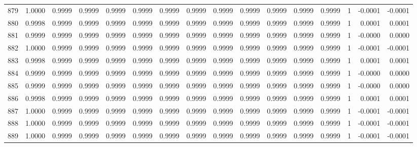 \begin{tabular}{lrrrrrrrrrrrrrrr}
879 &      1.0000 &  0.9999 &  0.9999 &  0.9999 &  0.9999 &  0.9999 &  0.9999 &  0.9999 &  0.9999 &  0.9999 &   0.9999 &     0.9999 &      1 &                   -0.0001 &                    -0.0001 \\
880 &      0.9998 &  0.9999 &  0.9999 &  0.9999 &  0.9999 &  0.9999 &  0.9999 &  0.9999 &  0.9999 &  0.9999 &   0.9999 &     0.9999 &      1 &                    0.0001 &                     0.0001 \\
881 &      0.9999 &  0.9999 &  0.9999 &  0.9999 &  0.9999 &  0.9999 &  0.9999 &  0.9999 &  0.9999 &  0.9999 &   0.9999 &     0.9999 &      1 &                   -0.0000 &                     0.0000 \\
882 &      1.0000 &  0.9999 &  0.9999 &  0.9999 &  0.9999 &  0.9999 &  0.9999 &  0.9999 &  0.9999 &  0.9999 &   0.9999 &     0.9999 &      1 &                   -0.0001 &                    -0.0001 \\
883 &      0.9998 &  0.9999 &  0.9999 &  0.9999 &  0.9999 &  0.9999 &  0.9999 &  0.9999 &  0.9999 &  0.9999 &   0.9999 &     0.9999 &      1 &                    0.0001 &                     0.0001 \\
884 &      0.9999 &  0.9999 &  0.9999 &  0.9999 &  0.9999 &  0.9999 &  0.9999 &  0.9999 &  0.9999 &  0.9999 &   0.9999 &     0.9999 &      1 &                   -0.0000 &                     0.0000 \\
885 &      0.9999 &  0.9999 &  0.9999 &  0.9999 &  0.9999 &  0.9999 &  0.9999 &  0.9999 &  0.9999 &  0.9999 &   0.9999 &     0.9999 &      1 &                   -0.0000 &                     0.0000 \\
886 &      0.9998 &  0.9999 &  0.9999 &  0.9999 &  0.9999 &  0.9999 &  0.9999 &  0.9999 &  0.9999 &  0.9999 &   0.9999 &     0.9999 &      1 &                    0.0001 &                     0.0001 \\
887 &      1.0000 &  0.9999 &  0.9999 &  0.9999 &  0.9999 &  0.9999 &  0.9999 &  0.9999 &  0.9999 &  0.9999 &   0.9999 &     0.9999 &      1 &                   -0.0001 &                    -0.0001 \\
888 &      1.0000 &  0.9999 &  0.9999 &  0.9999 &  0.9999 &  0.9999 &  0.9999 &  0.9999 &  0.9999 &  0.9999 &   0.9999 &     0.9999 &      1 &                   -0.0001 &                    -0.0001 \\
889 &      1.0000 &  0.9999 &  0.9999 &  0.9999 &  0.9999 &  0.9999 &  0.9999 &  0.9999 &  0.9999 &  0.9999 &   0.9999 &     0.9999 &      1 &                   -0.0001 &                    -0.0001 \\

\end{tabular}
